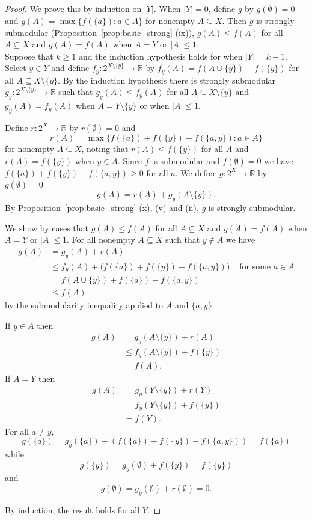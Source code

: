 \documentclass[10pt,a4paper]{amsart}
\renewcommand{\Re}{\mathbb{R}}
\begin{document}
 \begin{proof}
 We prove this by induction on $|Y|$.  When $|Y| = 0$, define $g$ by $g(\emptyset) = 0$ and $g(A)  = \max\{f(\{a\}): a \in A\}$ for nonempty $A \subseteq X$. Then $g$ is strongly submodular (Proposition~\ref{prop:basic_strong} (ix)),  $g(A) \leq f(A)$ for all $A \subseteq X$ and  $g(A) = f(A)$ when $A =Y$ or $|A| \leq 1$. \\
  
 Suppose that $k \geq 1$ and the induction hypothesis holds for when $|Y| = k-1$. Select $y \in Y$ and define $f_y:2^{X \setminus \{y\}} \rightarrow \Re$ by $f_y(A) = f(A \cup \{y\}) - f(\{y\})$ for all $A \subseteq X \setminus \{y\}$. By the induction hypothesis there is strongly submodular $g_y:2^{X \setminus \{y\}} \rightarrow \Re$ such that $g_y(A) \leq f_y(A)$ for all $A \subseteq X \setminus \{y\}$ and $g_y(A) = f_y(A)$ when $A =  Y \setminus \{y\}$ or when $|A| \leq 1$. 
 
Define $r: 2^X \rightarrow \Re$ by $r(\emptyset) = 0$ and 
\[r(A) = \max \{ f(\{a\}) + f(\{y\}) - f(\{a,y\}) :  a \in A\}\]
for nonempty $A \subseteq X$, noting that $r(A) \leq f(\{y\})$ for all $A$ and $r(A) = f(\{y\})$ when $y \in A$. Since $f$ is submodular and $f(\emptyset) = 0$ we have $f(\{a\}) + f(\{y\}) - f(\{a,y\}) \geq 0$ for all $a$.  We define $g:2^X \rightarrow \Re$ by $g(\emptyset) = 0$
 \[g(A) = r(A) + g_y(A \setminus \{y\}).\]
 By Proposition~\ref{prop:basic_strong} (x), (v) and (ii), $g$ is strongly submodular.
  
We show by cases that $g(A) \leq f(A)$ for all $A \subseteq X$ and $g(A) = f(A)$ when $A =Y$ or $|A| \leq 1$.  
For all nonempty $A \subseteq X$ such that $y \not \in A$  we have
 \begin{align*}
 g(A) & = g_y(A) + r(A) \\
 & \leq f_y(A) + \big(f(\{a\}) + f(\{y\}) - f(\{a,y\}) \big)& \mbox{ for some $a \in A$}\\
  & = f(A \cup \{y\}) + f(\{a\})  - f(\{a,y\}) \\
  & \leq f(A)
  \end{align*}
  by the submodularity inequality applied to $A$ and $\{a,y\}$. 
  
  If $y \in A$ then
  \begin{align*}
  g(A) & = g_y(A \setminus \{y\}) + r(A) \\
  & \leq f_y(A \setminus \{y\}) + f(\{y\}) \\
  & = f(A).
  \end{align*}
  If $A = Y$ then 
  \begin{align*}
  g(A) & = g_y(Y \setminus \{y\}) + r(Y) \\
  & = f_y(Y \setminus \{y\}) + f(\{y\})\\
  & = f(Y).
  \end{align*}
  For all $a \neq y$,
   \[g(\{a\}) = g_y(\{a\}) + \left( f(\{a\}) + f(\{y\}) - f(\{a,y\})  \right) = f(\{a\})\]
  while
   \[g(\{y\}) = g_y(\emptyset) + f(\{y\}) = f(\{y\})\]
and
\[g(\emptyset) =  g_y(\emptyset) + r(\emptyset) = 0.\]  
 
  By induction, the result holds for all $Y$. 
  \end{proof}
\end{document}
